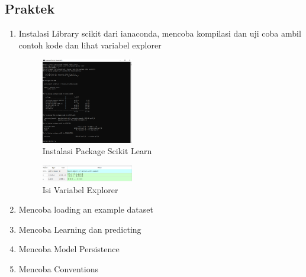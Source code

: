 \subsection{Praktek}
\begin{enumerate}
	\item Instalasi Library scikit dari ianaconda, mencoba kompilasi dan uji coba ambil contoh kode dan lihat variabel explorer
	\hfill\break
	\begin{figure}[H]
		\includegraphics[width=4cm]{figures/1174084/1/1.png}
		\centering
		\caption{Instalasi Package Scikit Learn}
	\end{figure}
	\begin{figure}[H]
		\includegraphics[width=4cm]{figures/1174084/1/2.png}
		\centering
		\caption{Isi Variabel Explorer}
	\end{figure}
	\item Mencoba loading an example dataset
	\hfill\break
	
	\item Mencoba Learning dan predicting
	\hfill\break
	
	\item Mencoba Model Persistence
	\hfill\break
	
	\item Mencoba Conventions
	\hfill\break
	
\end{enumerate}
